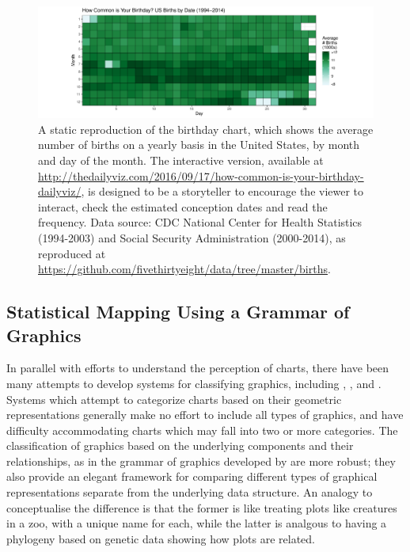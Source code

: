 \documentclass[letterpaper]{ar-1col}\usepackage[]{graphicx}\usepackage[]{color}
\newenvironment{knitrout}{}{} %
\begin{document}
\begin{knitrout}
\color{fgcolor}\begin{figure}
\includegraphics[width=1.3\linewidth]{figure/bdaychart-1} \caption{A static reproduction of the birthday chart, which shows the average number of births on a yearly basis in the United States, by month and day of the month. The interactive version, available at \url{http://thedailyviz.com/2016/09/17/how-common-is-your-birthday-dailyviz/}, is designed to be a storyteller to encourage the viewer to interact, check the estimated conception dates and read the frequency. Data source: CDC National Center for Health Statistics (1994-2003) and Social Security Administration (2000-2014), as reproduced at \url{https://github.com/fivethirtyeight/data/tree/master/births}.}\label{fig:bdaychart}
\end{figure}


\end{knitrout}

\subsection{Statistical Mapping Using a Grammar of Graphics}

In parallel with efforts to understand the perception of charts, there have been many attempts to develop systems for classifying graphics, including \citet{bertin1983semiology}, \citet{desnoyersTaxonomyVisualsScience2011}, and \citet{wilkinson1999grammar}. Systems which attempt to categorize charts based on their geometric representations generally make no effort to include all types of graphics, and have difficulty accommodating charts which may fall into two or more categories. The classification of graphics based on the underlying components and their relationships, as in the grammar of graphics developed by \citeauthor{wilkinson1999grammar} are more robust; they also provide an elegant framework for comparing different types of graphical representations separate from the underlying data structure. An analogy to conceptualise the difference is that the former is like treating plots like creatures in a zoo, with a unique name for each, while the latter is analgous to having a phylogeny based on genetic data showing how plots are related.
\end{document}
